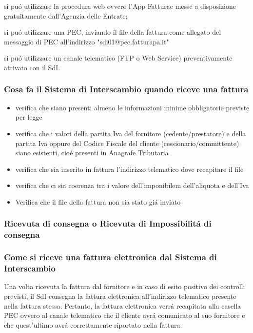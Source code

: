 \documentclass{article}
\begin{document}
si pu\'o utilizzare la procedura web ovvero l'App Fatturae messe a disposizione gratuitamente dall'Agenzia delle Entrate;

si pu\'o utilizzare una PEC, inviando il file della fattura come allegato del messaggio di PEC all'indirizzo "sdi01@pec.fatturapa.it"

si pu\'o utilizzare un canale telematico (FTP o Web Service) preventivamente attivato con il SdI.

\subsubsection{Cosa fa il Sistema di Interscambio quando riceve una fattura}
\begin{itemize}
    \item verifica che siano presenti almeno le informazioni minime obbligatorie previste per legge
    \item verifica che i valori della partita Iva del fornitore (cedente/prestatore) e della partita Iva oppure del Codice Fiscale del cliente (cessionario/committente) siano esistenti, cio\'e presenti in Anagrafe Tributaria
    \item verifica che sia inserito in fattura l'indirizzo telematico dove recapitare il file
    \item verifica che ci sia coerenza tra i valore dell'imponibilem dell'aliquota e dell'Iva
    \item Verifica che il file della fattura non sia stato gi\'a inviato
\end{itemize}

\subsubsection{Ricevuta di consegna o Ricevuta di Impossibilit\'a  di consegna}

\subsubsection{Come si riceve una fattura elettronica dal Sistema di Interscambio}
Una volta ricevuta la fattura dal fornitore e in caso di esito positivo dei controlli previsti, il SdI consegna la fattura elettronica all'indirizzo telematico presente nella fattura stessa. Pertanto, la fattura elettronica verr\'a recapitata alla casella PEC ovvero al canale telematico che il cliente avr\'a comunicato al suo fornitore e che quest'ultimo avr\'a correttamente riportato nella fattura. 
\end{document}
